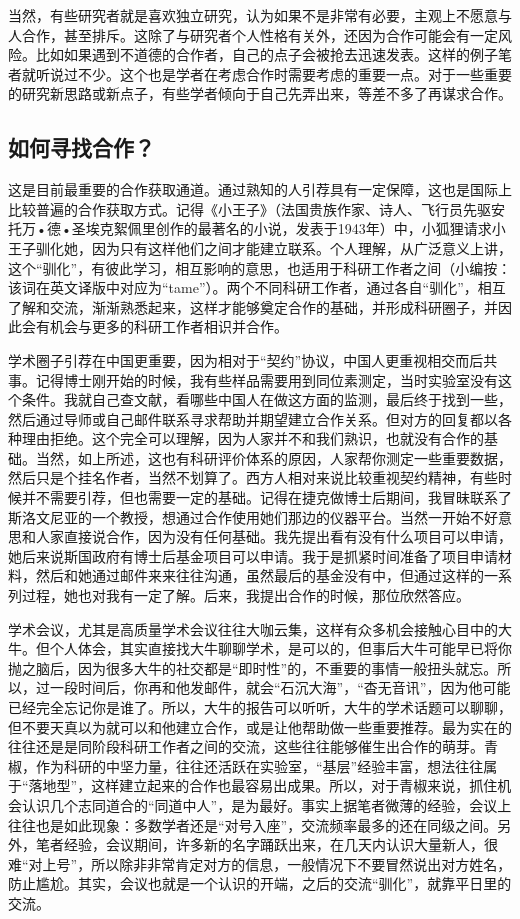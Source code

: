 \documentclass[
]{book}
\begin{document}
当然，有些研究者就是喜欢独立研究，认为如果不是非常有必要，主观上不愿意与人合作，甚至排斥。这除了与研究者个人性格有关外，还因为合作可能会有一定风险。比如如果遇到不道德的合作者，自己的点子会被抢去迅速发表。这样的例子笔者就听说过不少。这个也是学者在考虑合作时需要考虑的重要一点。对于一些重要的研究新思路或新点子，有些学者倾向于自己先弄出来，等差不多了再谋求合作。

\hypertarget{ux5982ux4f55ux5bfbux627eux5408ux4f5c}{%
\subsection{如何寻找合作？}\label{ux5982ux4f55ux5bfbux627eux5408ux4f5c}}

这是目前最重要的合作获取通道。通过熟知的人引荐具有一定保障，这也是国际上比较普遍的合作获取方式。记得《小王子》（法国贵族作家、诗人、飞行员先驱安托万•德•圣埃克絮佩里创作的最著名的小说，发表于1943年）中，小狐狸请求小王子驯化她，因为只有这样他们之间才能建立联系。个人理解，从广泛意义上讲，这个``驯化''，有彼此学习，相互影响的意思，也适用于科研工作者之间（小编按：该词在英文译版中对应为``tame''）。两个不同科研工作者，通过各自``驯化''，相互了解和交流，渐渐熟悉起来，这样才能够奠定合作的基础，并形成科研圈子，并因此会有机会与更多的科研工作者相识并合作。

学术圈子引荐在中国更重要，因为相对于``契约''协议，中国人更重视相交而后共事。记得博士刚开始的时候，我有些样品需要用到同位素测定，当时实验室没有这个条件。我就自己查文献，看哪些中国人在做这方面的监测，最后终于找到一些，然后通过导师或自己邮件联系寻求帮助并期望建立合作关系。但对方的回复都以各种理由拒绝。这个完全可以理解，因为人家并不和我们熟识，也就没有合作的基础。当然，如上所述，这也有科研评价体系的原因，人家帮你测定一些重要数据，然后只是个挂名作者，当然不划算了。西方人相对来说比较重视契约精神，有些时候并不需要引荐，但也需要一定的基础。记得在捷克做博士后期间，我冒昧联系了斯洛文尼亚的一个教授，想通过合作使用她们那边的仪器平台。当然一开始不好意思和人家直接说合作，因为没有任何基础。我先提出看有没有什么项目可以申请，她后来说斯国政府有博士后基金项目可以申请。我于是抓紧时间准备了项目申请材料，然后和她通过邮件来来往往沟通，虽然最后的基金没有中，但通过这样的一系列过程，她也对我有一定了解。后来，我提出合作的时候，那位欣然答应。

学术会议，尤其是高质量学术会议往往大咖云集，这样有众多机会接触心目中的大牛。但个人体会，其实直接找大牛聊聊学术，是可以的，但事后大牛可能早已将你抛之脑后，因为很多大牛的社交都是``即时性''的，不重要的事情一般扭头就忘。所以，过一段时间后，你再和他发邮件，就会``石沉大海''，``杳无音讯''，因为他可能已经完全忘记你是谁了。所以，大牛的报告可以听听，大牛的学术话题可以聊聊，但不要天真以为就可以和他建立合作，或是让他帮助做一些重要推荐。最为实在的往往还是是同阶段科研工作者之间的交流，这些往往能够催生出合作的萌芽。青椒，作为科研的中坚力量，往往还活跃在实验室，``基层''经验丰富，想法往往属于``落地型''，这样建立起来的合作也最容易出成果。所以，对于青椒来说，抓住机会认识几个志同道合的``同道中人''，是为最好。事实上据笔者微薄的经验，会议上往往也是如此现象：多数学者还是``对号入座''，交流频率最多的还在同级之间。另外，笔者经验，会议期间，许多新的名字踊跃出来，在几天内认识大量新人，很难``对上号''，所以除非非常肯定对方的信息，一般情况下不要冒然说出对方姓名，防止尴尬。其实，会议也就是一个认识的开端，之后的交流``驯化''，就靠平日里的交流。
\end{document}
